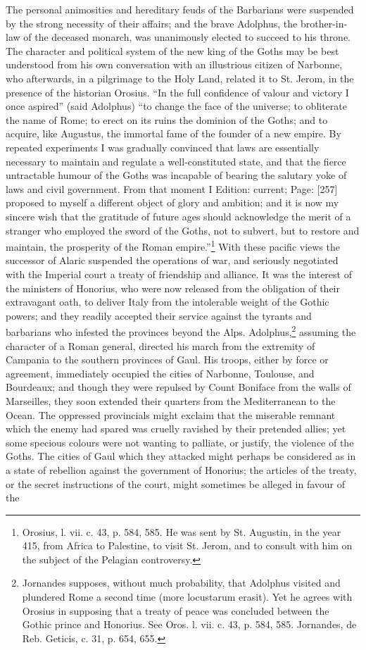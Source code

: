 The personal animosities and hereditary feuds of the Barbarians were suspended by the strong necessity of their affairs; and the brave Adolphus, the brother-in-law of the deceased monarch, was unanimously elected to succeed to his throne. The character and political system of the new king of the Goths may be best understood from his own conversation with an illustrious citizen of Narbonne, who afterwards, in a pilgrimage to the Holy Land, related it to St. Jerom, in the presence of the historian Orosius. \texthebrew{“}In the full confidence of valour and victory I once aspired\texthebrew{}” (said Adolphus) \texthebrew{“}to change the face of the universe; to obliterate the name of Rome; to erect on its ruins the dominion of the Goths; and to acquire, like Augustus, the immortal fame of the founder of a new empire. By repeated experiments I was gradually convinced that laws are essentially necessary to maintain and regulate a well-constituted state, and that the fierce untractable humour of the Goths was incapable of bearing the salutary yoke of laws and civil government. From that moment I Edition: current; Page: [257] proposed to myself a different object of glory and ambition; and it is now my sincere wish that the gratitude of future ages should acknowledge the merit of a stranger who employed the sword of the Goths, not to subvert, but to restore and maintain, the prosperity of the Roman empire.\texthebrew{}”\footnote{Orosius, l. vii. c. 43, p. 584, 585. He was sent by St. Augustin, in the year 415, from Africa to Palestine, to visit St. Jerom, and to consult with him on the subject of the Pelagian controversy.} With these pacific views the successor of Alaric suspended the operations of war, and seriously negotiated with the Imperial court a treaty of friendship and alliance. It was the interest of the ministers of Honorius, who were now released from the obligation of their extravagant oath, to deliver Italy from the intolerable weight of the Gothic powers; and they readily accepted their service against the tyrants and barbarians who infested the provinces beyond the Alps. Adolphus,\footnote{Jornandes supposes, without much probability, that Adolphus visited and plundered Rome a second time (more locustarum erasit). Yet he agrees with Orosius in supposing that a treaty of peace was concluded between the Gothic prince and Honorius. See Oros. l. vii. c. 43, p. 584, 585. Jornandes, de Reb. Geticis, c. 31, p. 654, 655.} assuming the character of a Roman general, directed his march from the extremity of Campania to the southern provinces of Gaul. His troops, either by force or agreement, immediately occupied the cities of Narbonne, Toulouse, and Bourdeaux; and though they were repulsed by Count Boniface from the walls of Marseilles, they soon extended their quarters from the Mediterranean to the Ocean. The oppressed provincials might exclaim that the miserable remnant which the enemy had spared was cruelly ravished by their pretended allies; yet some specious colours were not wanting to palliate, or justify, the violence of the Goths. The cities of Gaul which they attacked might perhaps be considered as in a state of rebellion against the government of Honorius; the articles of the treaty, or the secret instructions of the court, might sometimes be alleged in favour of the 